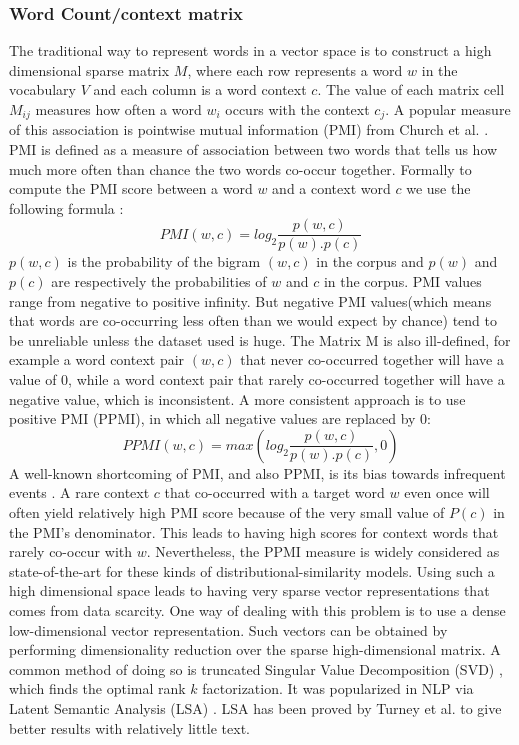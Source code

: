 \documentclass{article}
\begin{document}
\subsubsection{Word Count/context matrix}
The traditional way to represent words in a vector space is to construct a high dimensional sparse matrix $M$, where each row represents a word $w$ in the vocabulary $V$ and each column is a word context $c$. The value
of each matrix cell $M_{ij}$ measures how often	a word	$w_{i}$ occurs with the context $c_{j}$. A popular measure of this association is pointwise mutual information (PMI) from Church et al. \cite{church:1989}. PMI is defined as a measure of association between two words that tells us how much more often than chance the two words co-occur together. Formally to compute the PMI score between a word $w$ and a context word $c$ we use the following formula \cite{church:1989}:
$$PMI(w,c)=log_{2} \frac{p(w,c)}{p(w).p(c)}$$
$p(w,c)$ is the probability of the bigram $(w,c)$ in the corpus and $p(w)$ and $p(c)$ are respectively the probabilities of $w$ and $c$ in the corpus.
PMI values range from negative to positive infinity. But negative PMI values(which means that words are co-occurring less often than we would expect by chance) tend to be unreliable unless the dataset used is huge. The Matrix M is also ill-defined, for example a word context pair $(w,c)$ that never co-occurred together will have a value of 0, while a word context pair that rarely co-occurred together will have a negative value, which is inconsistent.
A more consistent approach is to use positive PMI (PPMI), in which all negative values are replaced by 0:
$$PPMI(w,c)= max(log_{2} \frac{p(w,c)}{p(w).p(c)},0)$$
A well-known shortcoming of PMI, and also PPMI, is its bias towards infrequent events  \cite{turney:2010}. A rare context $c$ that co-occurred with a target word $w$ even once will often yield relatively high PMI score because of the very small value of $P(c)$ in the PMI's denominator. This leads to having high scores for context words  that rarely co-occur with $w$. Nevertheless, the PPMI measure is widely considered as state-of-the-art for these kinds of distributional-similarity models.
Using such a high dimensional space leads to having very sparse vector representations that comes from data scarcity. One way of dealing with this problem is to use a dense low-dimensional vector representation.
Such vectors can be obtained by performing dimensionality reduction over the sparse high-dimensional matrix.
A common method of doing so is truncated Singular Value Decomposition (SVD) \cite{svd:1936}, which finds the optimal rank $k$ factorization. It was popularized in NLP via Latent Semantic Analysis (LSA) \cite{lsa:1990}. LSA has been proved by Turney et al.  \cite{turney:2001} to give better results with relatively little text.
\end{document}
